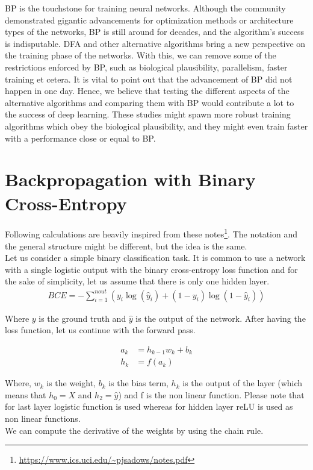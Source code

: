 \documentclass[a4paper, nobind]{templates/ociamthesis}
\begin{document}
BP is the touchstone for training neural networks. Although the community demonstrated gigantic advancements for optimization methods or architecture types of the networks, BP is still around for decades, and the algorithm's success is indisputable. DFA and other alternative algorithms bring a new perspective on the training phase of the networks. With this, we can remove some of the restrictions enforced by BP, such as biological plausibility, parallelism, faster training et cetera. It is vital to point out that the advancement of BP did not happen in one day. Hence, we believe that testing the different aspects of the alternative algorithms and comparing them with BP would contribute a lot to the success of deep learning. These studies might spawn more robust training algorithms which obey the biological plausibility, and they might even train faster with a performance close or equal to BP.~

\startappendices

\hypertarget{chap:appendix_a}{%
\chapter{Backpropagation with Binary Cross-Entropy}\label{chap:appendix_a}}

Following calculations are heavily inspired from these notes\footnote{\url{https://www.ics.uci.edu/~pjsadows/notes.pdf}}. The notation and the general structure might be different, but the idea is the same.\\
Let us consider a simple binary classification task. It is common to use a network with a single logistic output with the binary cross-entropy loss function and for the sake of simplicity, let us assume that there is only one hidden layer.
\[
\begin{aligned}
BCE=-\sum_{i=1}^{n o u t}\left(y_i \log \left(\hat{y}_i \right)+\left(1-y_i\right) \log \left(1-\hat{y}_i\right)\right)
\end{aligned}
\]

\noindent Where \(y\) is the ground truth and \(\hat{y}\) is the output of the network. After having the loss function, let us continue with the forward pass.

\[
\begin{aligned} 
a_{k} &= h_{k-1} w_{k} + b_k \\
h_k &= f(a_{k})
\end{aligned}
\]

\noindent Where, \(w_k\) is the weight, \(b_{k}\) is the bias term, \(h_k\) is the output of the layer (which means that \(h_0 = X\) and \(h_2 = \hat{y}\)) and f is the non linear function. Please note that for last layer logistic function is used whereas for hidden layer reLU is used as non linear functions.\\
We can compute the derivative of the weights by using the chain rule.
\end{document}
